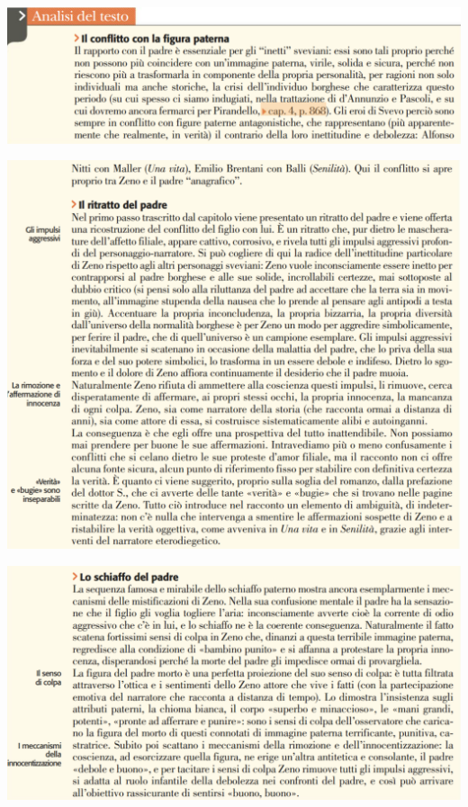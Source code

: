 \documentclass[a4paper, twoside, titlepage]{book}
\begin{document}
\begin{center}
\includegraphics[width=\textwidth]{padre1}
\end{center}
\vfill
\begin{center}
\includegraphics[width=\textwidth]{padre2}
\end{center}
\vfill
\begin{center}
\includegraphics[width=\textwidth]{padre3}
\end{center}
\vfill
\newpage
\end{document}

